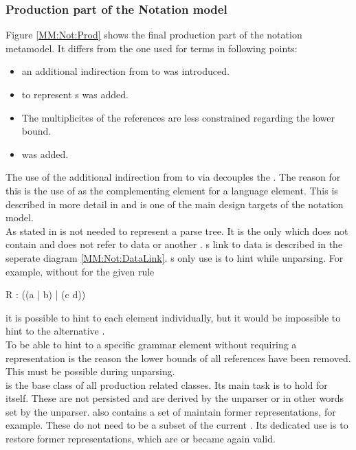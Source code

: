 \subsubsection{Production part of the Notation model}
Figure \ref{MM:Not:Prod} shows the final production part of the notation metamodel. It differs from the one used for terms in following points:
\begin{itemize}
	\item an additional indirection from  to  was introduced. 
	\item {} to represent s was added.
	\item The multiplicites of the references are less constrained regarding the lower bound.
	\item {} was added.
\end{itemize}
The use of the additional indirection from  to  via  decouples the . The reason for this is the use of  as the complementing element for a language element. This is described in more detail in  and is one of the main design targets of the notation model.\\
As stated in   is not needed to represent a parse tree. It is the only  which does not contain and does not refer to data or another . s link to data is described in the seperate diagram \ref{MM:Not:DataLink}. s only use is to hint while unparsing. For example, without  for the given rule
\begin{xtxt}
R : ((a | b) | (c d)) 
\end{xtxt}
it is possible to hint to each element individually, but it would be impossible to hint to the alternative . \\
To be able to hint to a specific grammar element without requiring a representation is the reason the lower bounds of all references have been removed. This must be possible during unparsing.\\
 is the base class of all production related classes. Its main task is to hold  for itself. These  are not persisted and are derived by the unparser or in other words set by the unparser.  also contains a set of  maintain former representations, for example. These do not need to be a subset of the current . Its dedicated use is to restore former representations, which are or became again valid.

